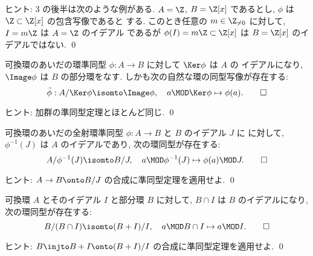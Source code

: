 \documentclass[12pt,twoside]{jarticle}
\begin{document}
\noindent
ヒント: 3 の後半は次のような例がある. 
$A=\Z$, $B=\Z[x]$ であるとし, $\phi$ は $\Z\subset\Z[x]$ の包含写像であると
する.  このとき任意の $m\in\Z_{\ne0}$ に対して, $I=m\Z$ は $A=\Z$ のイデアル
であるが $\phi(I)=m\Z\subset\Z[x]$ は $B=\Z[x]$ のイデアルではない.
\qed


\begin{question}[環の準同型定理]
  可換環のあいだの環準同型 $\phi:A\to B$ に対して $\Ker\phi$ は $A$ の
  イデアルになり, $\Image\phi$ は $B$ の部分環をなす.
  しかも次の自然な環の同型写像が存在する:
  \begin{equation*}
    \tilde\phi: A/\Ker\phi \isomto \Image\phi,
    \quad
    a\MOD\Ker\phi \mapsto \phi(a).
    \qed
  \end{equation*}
\end{question}

\noindent
ヒント: 加群の準同型定理とほとんど同じ. \qed


\begin{question}
\label{q:ring-isom-theorem-1}
  可換環のあいだの全射環準同型 $\phi:A\to B$ と $B$ のイデアル $J$ に
  に対して, $\phi^{-1}(J)$ は $A$ のイデアルであり, 
  次の環同型が存在する:
  \begin{equation*}
    A/\phi^{-1}(J) \isomto B/J,
    \quad
    a\MOD\phi^{-1}(J) \mapsto \phi(a)\MOD J.
    \qed
  \end{equation*}
\end{question}

\noindent
ヒント: $A\to B\onto B/J$ の合成に準同型定理を適用せよ. 
\qed


\begin{question}[第二同型定理]
\label{q:ring-isom-theorem-2}
  可換環 $A$ とそのイデアル $I$ と部分環 $B$ に対して, 
  $B\cap I$ は $B$ のイデアルになり,
  次の環同型が存在する:
  \begin{equation*}
    B/(B\cap I) \isomto (B+I)/I,
    \quad
    a\MOD B\cap I \mapsto a\MOD I.
    \qed
  \end{equation*}
\end{question}

\medskip
\noindent
ヒント: $B\injto B+I\onto (B+I)/I$ の合成に準同型定理を適用せよ.
\qed

\end{document}

